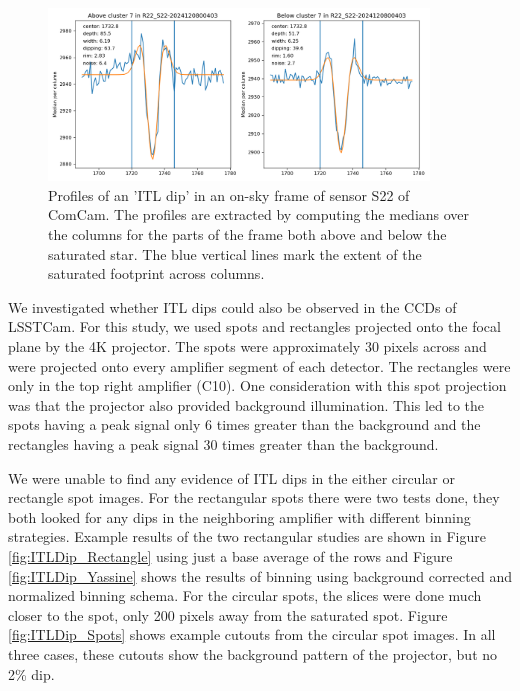 \begin{figure}[ht]
\begin{centering}
\includegraphics[width=0.9\textwidth]{figures/profilefits-R22_S22-2024120800403-cluster7.png}
\end{centering}
\caption{Profiles of an 'ITL dip' in an on-sky frame of sensor S22 of ComCam. The profiles are extracted by computing the medians over the columns for the parts of the frame both above and below the saturated star. The blue vertical lines mark the extent of the saturated footprint across columns.}
\label{fig:ITLDip_profile}
\end{figure}


We investigated whether ITL dips could also be observed in the CCDs of
LSSTCam. For this study, we used spots and rectangles projected onto the focal plane by the 4K
projector. The spots were approximately 30 pixels across
and were projected onto every amplifier segment of each detector. The rectangles were only
in the top right amplifier (C10). One consideration with this spot
projection was that the projector also provided background illumination. This led to the spots having a peak signal only 6 times greater
than the background and the rectangles having a peak signal 30 times greater
than the background.

We were unable to find any evidence of ITL
dips in the either circular or rectangle spot images. For the rectangular spots there were two tests done, they both looked for any dips in the neighboring amplifier with different binning strategies. Example results of the two rectangular studies are shown in Figure \ref{fig:ITLDip_Rectangle} using just a base average of the rows and Figure \ref{fig:ITLDip_Yassine} shows the results of binning using background corrected and normalized binning schema. For the circular spots, the slices were done much closer to the spot, only 200 pixels away from the saturated spot. Figure \ref{fig:ITLDip_Spots} shows example cutouts from the circular spot images. In all three cases, these cutouts show the background
pattern of the projector, but no 2\% dip.

